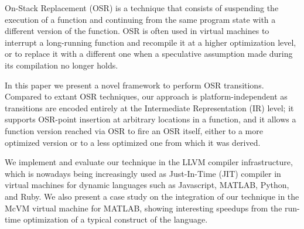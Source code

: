 On-Stack Replacement (OSR) is a technique that consists of suspending the execution of a function and continuing from the same program state with a different version of the function. OSR is often used in virtual machines to interrupt a long-running function and recompile it at a higher optimization level, or to replace it with a different one when a speculative assumption made during its compilation no longer holds.

In this paper we present a novel framework to perform OSR transitions. Compared to extant OSR techniques, our approach is platform-independent as transitions are encoded entirely at the Intermediate Representation (IR) level; it supports OSR-point insertion at arbitrary locations in a function, and it allows a function version reached via OSR to fire an OSR itself, either to a more optimized version or to a less optimized one from which it was derived.

We implement and evaluate our technique in the LLVM compiler infrastructure, which is nowadays being increasingly used as Just-In-Time (JIT) compiler in virtual machines for dynamic languages such as Javascript, MATLAB, Python, and Ruby. We also present a case study on the integration of our technique in the McVM virtual machine for MATLAB, showing interesting speedups from the run-time optimization of a typical construct of the language.
  
  
  
  
  
  
  
  
  
